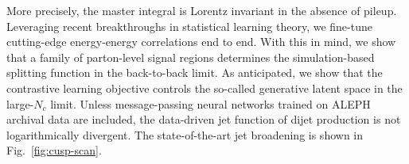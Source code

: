 More precisely, the master integral is Lorentz invariant in the absence
of pileup. Leveraging recent breakthroughs in statistical learning
theory, we fine-tune cutting-edge energy-energy correlations end to end.
With this in mind, we show that a family of parton-level signal regions
determines the simulation-based splitting function in the back-to-back
limit. As anticipated, we show that the contrastive learning objective
controls the so-called generative latent space in the large-$N_c$ limit.
Unless message-passing neural networks trained on ALEPH archival data
are included, the data-driven jet function of dijet production is not
logarithmically divergent. The state-of-the-art jet broadening is shown
in Fig.~\ref{fig:cusp-scan}.

